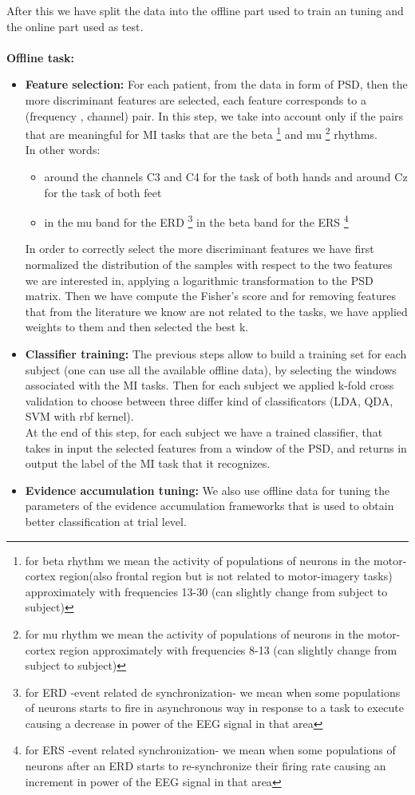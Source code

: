 After this we have split the data into the offline part used to train an tuning and the online part used as test.\\ \\
{\Large \textbf{Offline task:}}
\begin{itemize}
\item \textbf{Feature selection:}  For each patient, from the data in form of PSD, then the more discriminant features are selected, each feature corresponds to a (frequency , channel) pair. In this step, we take into account only if the pairs that are meaningful for MI tasks that are the beta
\footnote{for beta rhythm we mean the activity of populations of neurons in the motor-cortex region(also frontal region but is not related to motor-imagery tasks) approximately with frequencies 13-30 (can slightly change from subject to subject)}
 and mu
 \footnote{for mu rhythm we mean the activity of populations of neurons in the motor-cortex region approximately with frequencies 8-13 (can slightly change from subject to subject)}
rhythms.\\
In other words:
\begin{itemize}
\item around the channels C3 and C4 for the task of both hands and around Cz for the task of both feet
\item  in the mu band for the ERD
 \footnote{for ERD -event related de synchronization- we mean when some populations of neurons starts to fire in asynchronous way in response to a task to execute causing a decrease in power of the EEG signal in that area}
 in the beta band for the ERS 
 \footnote{for ERS -event related synchronization- we mean when some populations of neurons after an ERD starts to re-synchronize their firing rate causing an increment in power of the EEG signal in that area}
\end{itemize}
In order to correctly select the more discriminant features we have first normalized the distribution of the samples with respect to the two features we are interested in, applying a logarithmic transformation to the PSD matrix.
Then we have compute the Fisher's score and for removing features that from the literature we know are not related to the tasks, we have applied weights to them and then selected the best k.
\item \textbf{Classifier training:} The previous steps allow to build a training set for each subject (one can use all the available offline data), by selecting the windows associated with the MI tasks. Then for each subject we applied k-fold cross validation to choose between three differ kind of classificators (LDA, QDA, SVM with rbf kernel).\\
At the end of this step, for each subject we have a trained classifier, that takes in input the selected features from a window of the PSD, and returns in output the label of the MI task that it recognizes. \\
\item \textbf{Evidence accumulation tuning:} We also use offline data for tuning the parameters of the evidence accumulation frameworks that is used to obtain better classification at trial level. 
\end{itemize}

